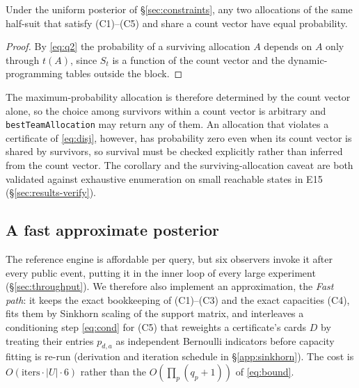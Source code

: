 \begin{corollary}
\label{cor:equalprob}
Under the uniform posterior of \S\ref{sec:constraints}, any two allocations of
the same half-suit that satisfy (C1)--(C5) and share a count vector have equal
probability.
\end{corollary}

\begin{proof}
By \eqref{eq:q2} the probability of a surviving allocation $A$ depends on $A$
only through $t(A)$, since $S_t$ is a function of the count vector and the
dynamic-programming tables outside the block.
\end{proof}

The maximum-probability allocation is therefore determined by the count vector
alone, so the choice among survivors within a count vector is arbitrary and
\texttt{bestTeamAllocation} may return any of them. An allocation that
violates a certificate of \eqref{eq:disj}, however, has probability zero even
when its count vector is shared by survivors, so survival must be checked
explicitly rather than inferred from the count vector. The corollary and the
surviving-allocation caveat are both validated against exhaustive enumeration
on small reachable states in E15 (\S\ref{sec:results-verify}).

\subsection{A fast approximate posterior}
\label{sec:fast}

The reference engine is affordable per query, but six observers invoke it
after every public event, putting it in the inner loop of every large
experiment (\S\ref{sec:throughput}). We therefore also implement an
approximation, the \emph{Fast path}: it keeps the exact bookkeeping of
(C1)--(C3) and the exact capacities (C4), fits them by Sinkhorn scaling of the
support matrix, and interleaves a conditioning step \eqref{eq:cond} for (C5)
that reweights a certificate's cards $D$ by treating their entries $p_{d,a}$
as independent Bernoulli indicators before capacity fitting is re-run
(derivation and iteration schedule in \S\ref{app:sinkhorn}). The cost is
$O(\text{iters} \cdot |U| \cdot 6)$ rather than the $O(\prod_p (q_p+1))$ of
\eqref{eq:bound}.

